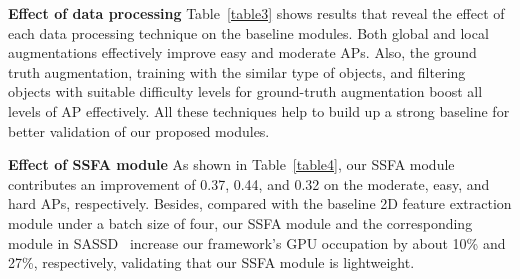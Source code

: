 \documentclass[letterpaper]{article}
\begin{document}
\begin{table}[!t]
    \small
    \begin{center}
    \end{center}
    \vspace*{-2mm}
    \caption{Ablation study on our modules: SSFA, CF, and DI-NMS.
    Here, we report the 3D average precisions of 11 sampling recall points for car detection on the KITTI val split.}
    \label{table4}
\end{table}


{\bf Effect of data processing}
Table~\ref{table3} shows results that reveal the effect of each data processing technique on the baseline modules.
Both global and local augmentations effectively improve easy and moderate APs.
Also, the ground truth augmentation, training with the similar type of objects, and
filtering objects with suitable difficulty levels for ground-truth augmentation boost all levels of AP effectively.
All these techniques help to build up a strong baseline for better validation of our proposed modules.


{\bf Effect of SSFA module}
As shown in Table~\ref{table4}, our SSFA module contributes an improvement of 0.37, 0.44, and 0.32 on the moderate, easy, and hard APs, respectively.
Besides, compared with the baseline 2D feature extraction module under a batch size of four, our SSFA module and the corresponding module in SASSD~\cite{he2020structure} increase our framework's GPU occupation by about 10\% and 27\%, respectively, validating that our SSFA module is lightweight.
\end{document}
